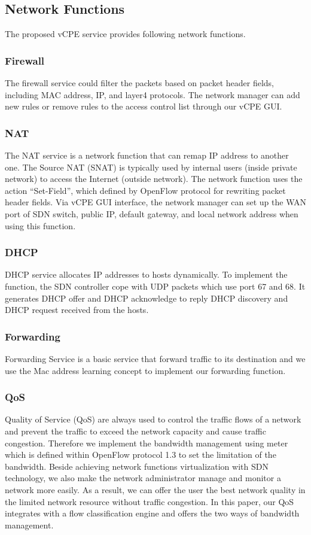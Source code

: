 \documentclass[journal]{IEEEtran}
\begin{document}
\subsection{Network Functions}
The proposed vCPE service provides following network functions.

\subsubsection{Firewall}
The firewall service could filter the packets based on packet header fields, including MAC address, IP, and layer4 protocols. The network manager can add new rules or remove rules to the access control list through our vCPE GUI.

\subsubsection{NAT}
The NAT service is a network function that can remap  IP address to another one. The Source NAT (SNAT) is typically used by internal users (inside private network) to access the Internet (outside network). The network function uses the action “Set-Field”, which defined by OpenFlow protocol for rewriting packet header fields. Via vCPE GUI interface, the network manager can set up the WAN port of SDN switch, public IP, default gateway, and local network address when using this function.

\subsubsection{DHCP}
DHCP service allocates IP addresses to hosts dynamically. To implement the function, the SDN controller cope with UDP packets which use port 67 and 68. It generates DHCP offer and DHCP acknowledge to reply DHCP discovery and DHCP request received from the hosts.

\subsubsection{Forwarding}
Forwarding Service is a basic service that forward traffic to its destination and we use the Mac address learning concept to implement our forwarding function.

\subsubsection{QoS}
Quality of Service (QoS) are always used to control the traffic flows of a network and prevent the traffic to exceed the network capacity and cause traffic congestion. Therefore we implement the bandwidth management using meter which is defined within OpenFlow protocol 1.3 to set the limitation of the bandwidth.
Beside achieving network functions virtualization with SDN technology, we also make the network administrator manage and monitor a network more easily. As a result, we can offer the user the best network quality in the limited network resource without traffic congestion.
In this paper, our QoS integrates with a flow classification engine and offers the two ways of bandwidth management.
\end{document}
